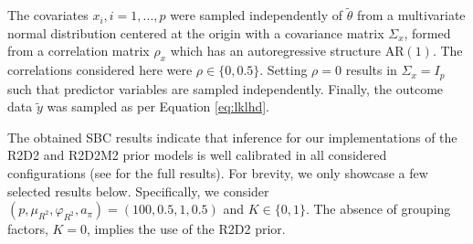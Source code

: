 The covariates $x_i, i=1,...,p$ were sampled independently of $\tilde{\theta}$ from a multivariate normal distribution centered at the origin with a covariance matrix $\Sigma_x$, formed from a correlation matrix $\rho_x$ which has  an autoregressive structure $\text{AR}(1)$. The correlations considered here were $\rho \in  \{0,0.5\}$. Setting $\rho=0$ results in $\Sigma_x=I_p$ such that predictor variables are sampled independently. Finally, the outcome data $\tilde{y}$ was sampled as per Equation \eqref{eq:lklhd}.

The obtained SBC results indicate that inference for our implementations of the R2D2 and R2D2M2 prior models is well calibrated in all considered configurations (see {\myosfresults} for the full results). For brevity, we only showcase a few selected results below. Specifically, we consider $(p,\mu_{R^2}, \varphi_{R^2}, a_{\pi})=( 100, 0.5, 1,0.5)$ and $K \in \{0, 1\}$. The absence of grouping factors, $K=0$, implies the use of the R2D2 prior.

